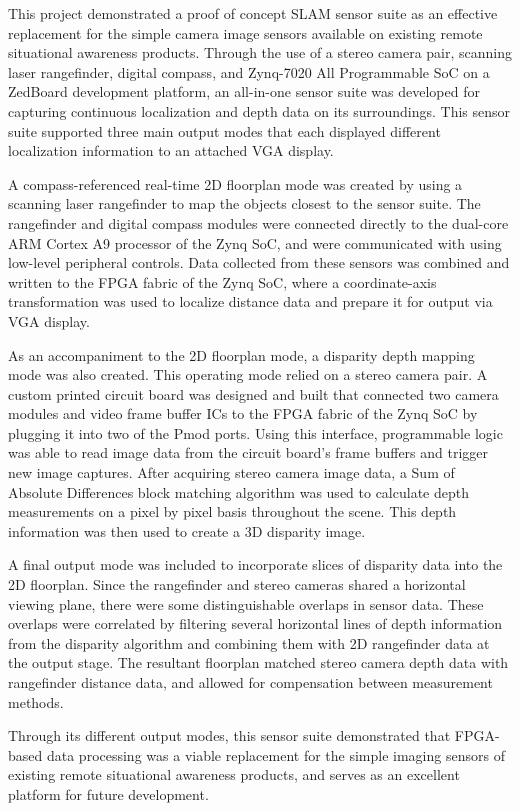 This project demonstrated a proof of concept SLAM sensor suite as an effective replacement for the simple camera image sensors available on existing remote situational awareness products. Through the use of a stereo camera pair, scanning laser rangefinder,  digital compass, and Zynq-7020 All Programmable SoC on a ZedBoard development platform, an all-in-one sensor suite was developed for capturing continuous localization and depth data on its surroundings. This sensor suite supported three main output modes that each displayed different localization information to an attached VGA display.
\par
A compass-referenced real-time 2D floorplan mode was created by using a scanning laser rangefinder to map the objects closest to the sensor suite. The rangefinder and digital compass modules were connected directly to the dual-core ARM Cortex A9 processor of the Zynq SoC, and were communicated with using low-level peripheral controls. Data collected from these sensors was combined and written to the FPGA fabric of the Zynq SoC, where a coordinate-axis transformation was used to localize distance data and prepare it for output via VGA display.
\par
As an accompaniment to the 2D floorplan mode, a disparity depth mapping mode was also created. This operating mode relied on a stereo camera pair. A custom printed circuit board was designed and built that connected two camera modules and video frame buffer ICs to the FPGA fabric of the Zynq SoC by plugging it into two of the Pmod ports. Using this interface, programmable logic was able to read image data from the circuit board's frame buffers and trigger new image captures. After acquiring stereo camera image data, a Sum of Absolute Differences block matching algorithm was used to calculate depth measurements on a pixel by pixel basis throughout the scene. This depth information was then used to create a 3D disparity image.
\par
A final output mode was included to incorporate slices of disparity data into the 2D floorplan. Since the rangefinder and stereo cameras shared a horizontal viewing plane, there were some distinguishable overlaps in sensor data. These overlaps were correlated by filtering several horizontal lines of depth information from the disparity algorithm and combining them with 2D rangefinder data at the output stage. The resultant floorplan matched stereo camera depth data with rangefinder distance data, and allowed for compensation between measurement methods.
\par
Through its different output modes, this sensor suite demonstrated that FPGA-based data processing was a viable replacement for the simple imaging sensors of existing remote situational awareness products, and serves as an excellent platform for future development.

